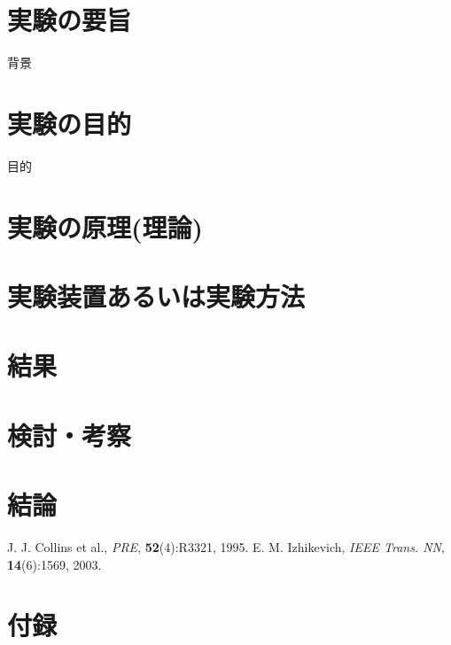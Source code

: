 \section{実験の要旨}
背景


\section{実験の目的}
目的


\section{実験の原理(理論)}


\section{実験装置あるいは実験方法}

\clearpage

\section{結果}

\section{検討・考察}

\section{結論}



\begin{thebibliography}{99}
\label{sannkoubunnkenn_chapter}
	 J. J. Collins et al.,
	 {\em PRE}, {\bf 52}(4):R3321, 1995.
  E. M. Izhikevich, 
	 {\em IEEE Trans. NN}, {\bf 14}(6):1569, 2003. 
\end{thebibliography}

\clearpage
\appendix
\section{付録}



